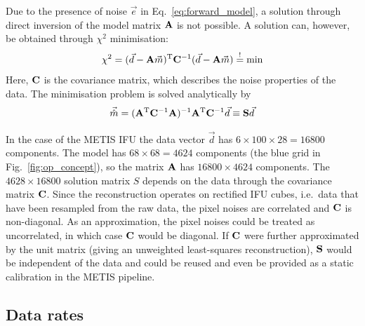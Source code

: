 Due to the presence of noise $\vec{e}$ in Eq.~\eqref{eq:forward_model},
a solution through direct inversion of the model matrix $\mathbf{A}$ is not possible.
A solution can, however, be obtained through $\chi^{2}$ minimisation:
\begin{equation}
    \chi^{2} = (\vec{d} - \mathbf{A}\vec{m})^{\mathrm{T}}\mathbf{C}^{-1}(\vec{d} - \mathbf{A}\vec{m}) \stackrel{!}{=} \mathrm{min}
    \label{eq:chi2_minimisation}
\end{equation}
Here, $\mathbf{C}$ is the covariance matrix, which describes the noise properties of the data.
The minimisation problem is solved analytically by
\begin{equation}
    \label{eq:chi2_solution}
    \vec{\hat{m}} = (\mathbf{A}^{\mathrm{T}}\mathbf{C}^{-1}\mathbf{A})^{-1}\mathbf{A}^{\mathrm{T}}\mathbf{C}^{-1}\vec{d} \equiv \mathbf{S}\vec{d}
\end{equation}

In the case of the METIS IFU the data vector $\vec{d}$ has $6 \times 100 \times 28 = 16800$ components.
The model has $68\times 68 = 4624$ components (the blue grid in Fig.~\ref{fig:op_concept}),
so the matrix $\mathbf{A}$ has $16800 \times 4624$ components.
The $4628 \times 16800$ solution matrix $S$ depends on the data
through the covariance matrix $\mathbf{C}$. Since the reconstruction operates on rectified IFU cubes,
i.e.~data that have been resampled from the raw data,
the pixel noises are correlated and $\mathbf{C}$ is non-diagonal.
As an approximation, the pixel noises could be treated as uncorrelated, in which case $\mathbf{C}$ would be diagonal.
If $\mathbf{C}$ were further approximated by the unit matrix (giving an unweighted least-squares reconstruction),
$\mathbf{S}$ would be independent of the data and could be reused and even be provided as a static calibration in the METIS pipeline.

\subsection{Data rates}
\label{ssec:criticalifudatarate}
\label{ssec:ifu_data_rate}

